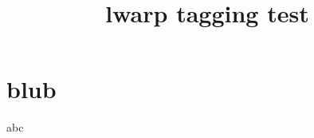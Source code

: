 \documentclass{article}
\title{lwarp tagging test}
\begin{document}
\maketitle
\section{blub}
abc
\end{document}
